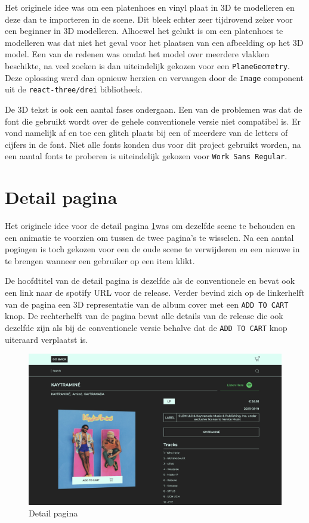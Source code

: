Het originele idee was om een platenhoes en vinyl plaat in 3D te modelleren en deze dan te importeren in de scene. Dit bleek echter zeer tijdrovend zeker voor een beginner in 3D modelleren. Alhoewel het gelukt is om een platenhoes te modelleren was dat niet het geval voor het plaatsen van een afbeelding op het 3D model. Een van de redenen was omdat het model over meerdere vlakken beschikte, na veel zoeken is dan uiteindelijk gekozen voor een \texttt{PlaneGeometry}. Deze oplossing werd dan opnieuw herzien en vervangen door de \texttt{Image} component uit de \texttt{react-three/drei} bibliotheek.

De 3D tekst is ook een aantal fases ondergaan. Een van de problemen was dat de font die gebruikt wordt over de gehele conventionele versie niet compatibel is. Er vond namelijk af en toe een glitch plaats bij een of meerdere van de letters of cijfers in de font. Niet alle fonts konden dus voor dit project gebruikt worden, na een aantal fonts te proberen is uiteindelijk gekozen voor \texttt{Work Sans Regular}.

\section{Detail pagina}

Het originele idee voor de detail pagina \ref{fig:detailPageThree}was om dezelfde scene te behouden en een animatie te voorzien om tussen de twee pagina's te wisselen. Na een aantal pogingen is toch gekozen voor een de oude scene te verwijderen en een nieuwe in te brengen wanneer een gebruiker op een item klikt.

De hoofdtitel van de detail pagina is dezelfde als de conventionele en bevat ook een link naar de spotify URL voor de release. Verder bevind zich op de linkerhelft van de pagina een 3D representatie van de album cover met een \texttt{ADD TO CART} knop. De rechterhelft van de pagina bevat alle details van de release die ook dezelfde zijn als bij de conventionele versie behalve dat de \texttt{ADD TO CART} knop uiteraard verplaatst is.

\begin{figure}[h]
	\centering
	\includegraphics[width=1\linewidth]{graphics/detailPageThree}
	\caption[Detail pagina]{Detail pagina}
	\label{fig:detailPageThree}
\end{figure}

